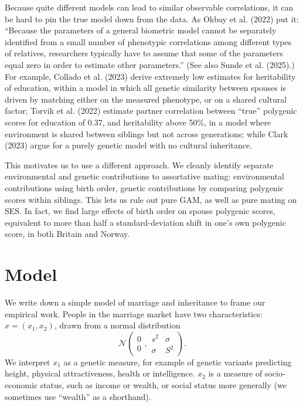 \documentclass[
  12pt,
]{article}
\theoremstyle{definition}
\theoremstyle{definition}
\theoremstyle{definition}
\theoremstyle{definition}
\theoremstyle{remark}
\begin{document}
Because quite different models can lead to similar observable
correlations, it can be hard to pin the true model down from the data.
As {Okbay et al.} (2022) put it: ``Because the parameters of a general
biometric model cannot be separately identified from a small number of
phenotypic correlations among different types of relatives, researchers
typically have to assume that some of the parameters equal zero in order
to estimate other parameters.'' (See also Sunde et al. (2025).) For
example, Collado et al. (2023) derive extremely low estimates for
heritability of education, within a model in which all genetic
similarity between spouses is driven by matching either on the measured
phenotype, or on a shared cultural factor; {Torvik et al.} (2022) estimate
partner correlation between ``true'' polygenic scores for education of
0.37, and heritability above 50\%, in a model where environment is shared
between siblings but not across generations; while Clark (2023)
argue for a purely genetic model with no cultural inheritance.

This motivates us to use a different approach. We cleanly identify
separate environmental and genetic contributions to assortative mating:
environmental contributions using birth order, genetic contributions by
comparing polygenic scores within siblings. This lets us rule out pure
GAM, as well as pure mating on SES. In fact, we find large effects of
birth order on spouse polygenic scores, equivalent to more than half a
standard-deviation shift in one's own polygenic score, in both Britain
and Norway.

\section{Model}\label{model}

We write down a simple model of marriage and inheritance to frame our empirical
work. People in the marriage market have two characteristics:
\(x=\left( x_{1},x_{2}\right)\), drawn from a normal distribution
\[
\mathcal{N}
\left( 
\begin{array}{c}
0 \\ 
0%
\end{array}%
,%
\begin{array}{cc}
s^{2} & \sigma \\ 
\sigma & S^{2}%
\end{array}%
\right).
\]
We interpret \(x_1\) as a genetic measure, for example of genetic variants predicting
height, physical attractiveness, health or intelligence. \(x_2\) is a measure of
socio-economic status, such as income or wealth, or social status more generally
(we sometimes use ``wealth'' as a shorthand).
\end{document}
